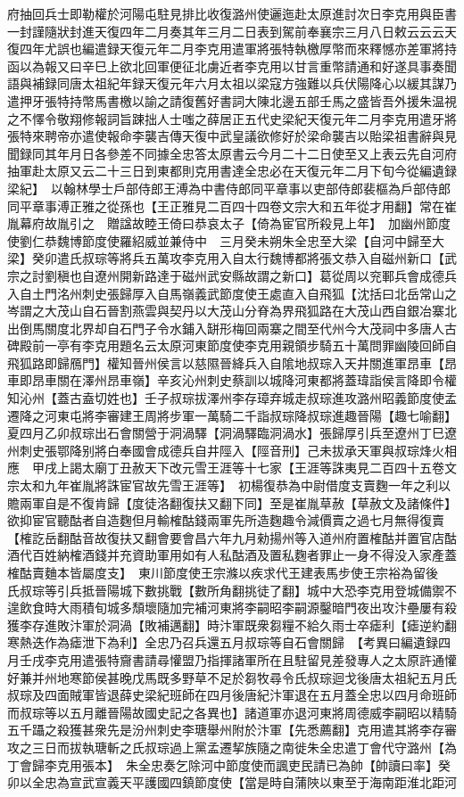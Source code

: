 府抽回兵士即勒權於河陽屯駐見排比收復潞州使邐迤赴太原進討次日李克用與臣書一封謹隨狀封進天復四年二月奏其年三月二日表到駕前奉襄宗三月八日敕云云云天復四年尤誤也編遣録天復元年二月李克用遣軍將張特執檄厚幣而來釋憾亦差軍將持函以為報又曰辛巳上欲北回軍便征北虜近者李克用以甘言重幣請通和好遂具事奏聞語與補録同唐太祖紀年録天復元年六月太祖以梁寇方強難以兵伏陽降心以緩其謀乃遣押牙張特持幣馬書檄以諭之請復舊好書詞大陳北邊五部壬馬之盛皆吾外援朱温視之不懌令敬翔修報詞旨踈拙人士嗤之薛居正五代史梁紀天復元年二月李克用遣牙將張特來聘帝亦遣使報命李襲吉傳天復中武皇議欲修好於梁命襲吉以貽梁祖書辭與見聞録同其年月日各參差不同據全忠答太原書云今月二十二日使至又上表云先自河府抽軍赴太原又云二十三日到東都則克用書達全忠必在天復元年二月下旬今從編遺録梁紀】　以翰林學士戶部侍郎王溥為中書侍郎同平章事以吏部侍郎裴樞為戶部侍郎同平章事溥正雅之從孫也【王正雅見二百四十四卷文宗大和五年從才用翻】常在崔胤幕府故胤引之　贈諡故睦王倚曰恭哀太子【倚為宦官所殺見上年】　加幽州節度使劉仁恭魏博節度使羅紹威並兼侍中　三月癸未朔朱全忠至大梁【自河中歸至大梁】癸卯遣氏叔琮等將兵五萬攻李克用入自太行魏博都將張文恭入自磁州新口【武宗之討劉稹也自遼州開新路達于磁州武安縣故謂之新口】葛從周以兖鄆兵會成德兵入自土門洺州刺史張歸厚入自馬嶺義武節度使王處直入自飛狐【沈括曰北岳常山之岑謂之大茂山自石晉割燕雲與契丹以大茂山分脊為界飛狐路在大茂山西自銀冶寨北出倒馬關度北界却自石門子令水鋪入缾形梅回兩寨之間至代州今大茂祠中多唐人古碑殿前一亭有李克用題名云太原河東節度使李克用親領步騎五十萬問罪幽陵回師自飛狐路即歸鴈門】權知晉州侯言以慈隰晉絳兵入自隂地叔琮入天井關進軍昂車【昂車即昂車關在澤州昂車嶺】辛亥沁州刺史蔡訓以城降河東都將蓋瑋詣侯言降即令權知沁州【蓋古盍切姓也】壬子叔琮拔澤州李存璋弃城走叔琮進攻潞州昭義節度使孟遷降之河東屯將李審建王周將步軍一萬騎二千詣叔琮降叔琮進趣晉陽【趣七喻翻】夏四月乙卯叔琮出石會關營于洞渦驛【洞渦驛臨洞渦水】張歸厚引兵至遼州丁巳遼州刺史張鄂降别將白奉國會成德兵自井陘入【陘音刑】己未拔承天軍與叔琮烽火相應　甲戌上謁太廟丁丑赦天下改元雪王涯等十七家【王涯等誅夷見二百四十五卷文宗太和九年崔胤將誅宦官故先雪王涯等】　初楊復恭為中尉借度支賣麴一年之利以贍兩軍自是不復肯歸【度徒洛翻復扶又翻下同】至是崔胤草赦【草赦文及諸條件】欲抑宦官聽酤者自造麴但月輸榷酤錢兩軍先所造麴趣令減價賣之過七月無得復賣【榷訖岳翻酤音故復扶又翻會要會昌六年九月勑揚州等入道州府置榷酤并置官店酤酒代百姓納榷酒錢并充資助軍用如有人私酤酒及置私麴者罪止一身不得没入家產蓋榷酤賣麯本皆屬度支】　東川節度使王宗滌以疾求代王建表馬步使王宗裕為留後　氏叔琮等引兵抵晉陽城下數挑戰【數所角翻挑徒了翻】城中大恐李克用登城備禦不遑飲食時大雨積旬城多頹壞隨加完補河東將李嗣昭李嗣源鑿暗門夜出攻汴壘屢有殺獲李存進敗汴軍於洞渦【敗補邁翻】時汴軍既衆芻糧不給久雨士卒瘧利【瘧逆約翻寒熱迭作為瘧泄下為利】全忠乃召兵還五月叔琮等自石會關歸　【考異曰編遺録四月壬戌李克用遣張特齎書請尋懽盟乃指揮諸軍所在且駐留見差發專人之太原許通懽好兼并州地寒節侯甚晚戊馬既多野草不足於芻牧尋令氏叔琮迴戈後唐太祖紀五月氏叔琮及四面賊軍皆退薛史梁紀班師在四月後唐紀汴軍退在五月蓋全忠以四月命班師而叔琮等以五月離晉陽故國史記之各異也】諸道軍亦退河東將周德威李嗣昭以精騎五千躡之殺獲甚衆先是汾州刺史李瑭舉州附於汴軍【先悉薦翻】克用遣其將李存審攻之三日而拔執瑭斬之氏叔琮過上黨孟遷挈族隨之南徙朱全忠遣丁會代守潞州【為丁會歸李克用張本】　朱全忠奏乞除河中節度使而諷吏民請已為帥【帥讀曰率】癸卯以全忠為宣武宣義天平護國四鎮節度使【當是時自蒲陜以東至于海南距淮北距河